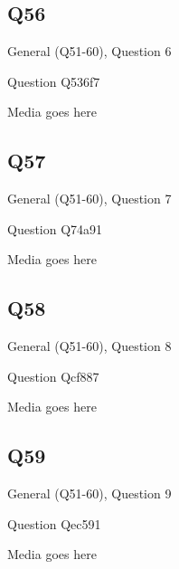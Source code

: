 \documentclass[11pt]{beamer}
\begin{document}
\subsection*{Q56}
\begin{frame}[t]{General (Q51-60), Question 6}
\vspace{2em}
\begin{block}{Question}
Q536f7
\end{block}
\begin{center}
Media goes here
\end{center}
\end{frame}
    

\subsection*{Q57}
\begin{frame}[t]{General (Q51-60), Question 7}
\vspace{2em}
\begin{block}{Question}
Q74a91
\end{block}
\begin{center}
Media goes here
\end{center}
\end{frame}
    

\subsection*{Q58}
\begin{frame}[t]{General (Q51-60), Question 8}
\vspace{2em}
\begin{block}{Question}
Qcf887
\end{block}
\begin{center}
Media goes here
\end{center}
\end{frame}
    

\subsection*{Q59}
\begin{frame}[t]{General (Q51-60), Question 9}
\vspace{2em}
\begin{block}{Question}
Qec591
\end{block}
\begin{center}
Media goes here
\end{center}
\end{frame}
    
\end{document}
